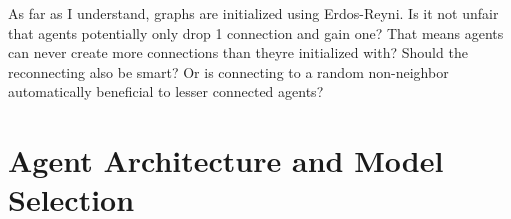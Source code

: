 %
%

As far as I understand, graphs are initialized using Erdos-Reyni. Is it not unfair that agents potentially only drop 1 connection and gain one? That means agents can never create more connections than theyre initialized with? Should the reconnecting also be smart? Or is connecting to a random non-neighbor automatically beneficial to lesser connected agents?

\section{Agent Architecture and Model Selection}
\label{sec:agent_architecture}

